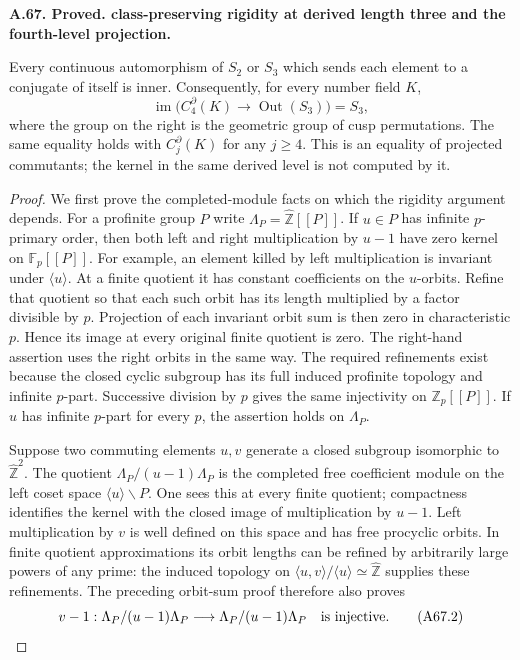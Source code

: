 \documentclass[11pt,oneside]{article}
\makeatletter
\newcounter{statementanchor}
\newenvironment{statement}[3]{%
 \refstepcounter{statementanchor}\def\@currentlabel{#1}%
 \par\addvspace{9pt}\noindent
 \textbf{#1. #2. #3.}\par\nobreak\noindent\ignorespaces
}{\par\addvspace{5pt}}
\makeatother
\begin{document}
\begin{statement}{A.67}{Proved}{class-preserving rigidity at derived length three and the fourth-level projection}
\label{st:A.67}\label{A:third-derived-class-rigidity}
Every continuous automorphism of $S_2$ or $S_3$
which sends each element to a conjugate of itself
is inner. Consequently, for every number field
$K$,
\[
 \operatorname{im}\bigl(
 C_4^\partial(K)\longrightarrow
                  \operatorname{Out}(S_3)\bigr)=S_3,
                                                        \tag{A67.1}
\]
where the group on the right is the geometric
group of cusp permutations. The same equality
holds with $C_j^\partial(K)$ for any $j\geq4$.
This is an equality of projected commutants;
the kernel in the same derived level is not
computed by it.
\end{statement}
\begin{proof}
We first prove the completed-module facts on
which the rigidity argument depends.
For a profinite group $P$ write
$\Lambda_P=\widehat{\mathbb Z}[[P]]$.
If $u\in P$ has infinite $p$-primary order,
then both left and right multiplication by
$u-1$ have zero kernel on $\mathbb F_p[[P]]$.
For example, an element killed by left
multiplication is invariant under $\langle u\rangle$.
At a finite quotient it has constant
coefficients on the $u$-orbits.
Refine that quotient so that each such orbit
has its length multiplied by a factor divisible
by $p$. Projection of each invariant orbit sum
is then zero in characteristic $p$.
Hence its image at every original finite
quotient is zero. The right-hand assertion
uses the right orbits in the same way.
The required refinements exist because the
closed cyclic subgroup has its full induced
profinite topology and infinite $p$-part.
Successive division by $p$ gives the same
injectivity on $\mathbb Z_p[[P]]$.
If $u$ has infinite $p$-part for every $p$,
the assertion holds on $\Lambda_P$.

Suppose two commuting elements $u,v$ generate
a closed subgroup isomorphic to
$\widehat{\mathbb Z}^2$.
The quotient
$\Lambda_P/(u-1)\Lambda_P$ is the completed
free coefficient module on the left coset
space $\langle u\rangle\backslash P$.
One sees this at every finite quotient;
compactness identifies the kernel with
the closed image of multiplication by $u-1$.
Left multiplication by $v$ is well defined
on this space and has free procyclic orbits.
In finite quotient approximations its orbit
lengths can be refined by arbitrarily large
powers of any prime: the induced topology
on $\langle u,v\rangle/\langle u\rangle
\simeq\widehat{\mathbb Z}$ supplies these
refinements. The preceding orbit-sum proof
therefore also proves
\[
 v-1:\Lambda_P/(u-1)\Lambda_P
       \longrightarrow\Lambda_P/(u-1)\Lambda_P
             \quad\hbox{is injective}.                \tag{A67.2}
\]


\end{proof}
\end{document}
